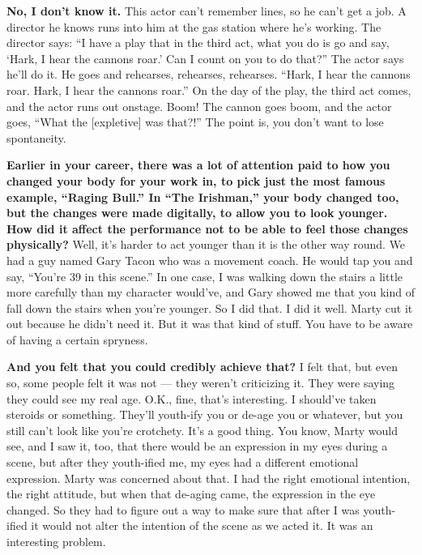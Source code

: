 \textbf{No, I don't know it.} This actor can't remember lines, so he
can't get a job. A director he knows runs into him at the gas station
where he's working. The director says: ``I have a play that in the third
act, what you do is go and say, `Hark, I hear the cannons roar.' Can I
count on you to do that?'' The actor says he'll do it. He goes and
rehearses, rehearses, rehearses. ``Hark, I hear the cannons roar. Hark,
I hear the cannons roar.'' On the day of the play, the third act comes,
and the actor runs out onstage. Boom! The cannon goes boom, and the
actor goes, ``What the {[}expletive{]} was that?!'' The point is, you
don't want to lose spontaneity.

\textbf{Earlier in your career, there was a lot of attention paid to how
you changed your body for your work in, to pick just the most famous
example, ``Raging Bull.'' In ``The Irishman,'' your body changed too,
but the changes were made digitally, to allow you to look younger. How
did it affect the performance not to be able to feel those changes
physically?} Well, it's harder to act younger than it is the other way
round. We had a guy named Gary Tacon who was a movement coach. He would
tap you and say, ``You're 39 in this scene.'' In one case, I was walking
down the stairs a little more carefully than my character would've, and
Gary showed me that you kind of fall down the stairs when you're
younger. So I did that. I did it well. Marty cut it out because he
didn't need it. But it was that kind of stuff. You have to be aware of
having a certain spryness.

\textbf{And you felt that you could credibly achieve that?} I felt that,
but even so, some people felt it was not --- they weren't criticizing
it. They were saying they could see my real age. O.K., fine, that's
interesting. I should've taken steroids or something. They'll youth-ify
you or de-age you or whatever, but you still can't look like you're
crotchety. It's a good thing. You know, Marty would see, and I saw it,
too, that there would be an expression in my eyes during a scene, but
after they youth-ified me, my eyes had a different emotional expression.
Marty was concerned about that. I had the right emotional intention, the
right attitude, but when that de-aging came, the expression in the eye
changed. So they had to figure out a way to make sure that after I was
youth-ified it would not alter the intention of the scene as we acted
it. It was an interesting problem.

